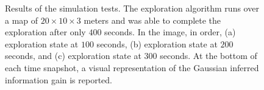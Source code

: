 \begin{figure}[!t]
\begin{center}
\begin{minipage}{.4\linewidth}
		\end{minipage}
		\begin{minipage}{.4\linewidth}
			\centering
		\end{minipage}
	\end{center}
	\caption{Results of the simulation tests. The exploration algorithm runs over a map of $20\times10\times3$
	meters and was able to complete the exploration after only $400$ seconds. In the image, in order,
	(a) exploration state at $100$ seconds, (b) exploration state at $200$ seconds, and (c) exploration state at $300$ seconds.
	At the bottom of each time snapshot, a visual representation of the Gaussian inferred information gain is reported.
	}\label{FIG:EXPLORATION-SIM-TEST}
\end{figure}
